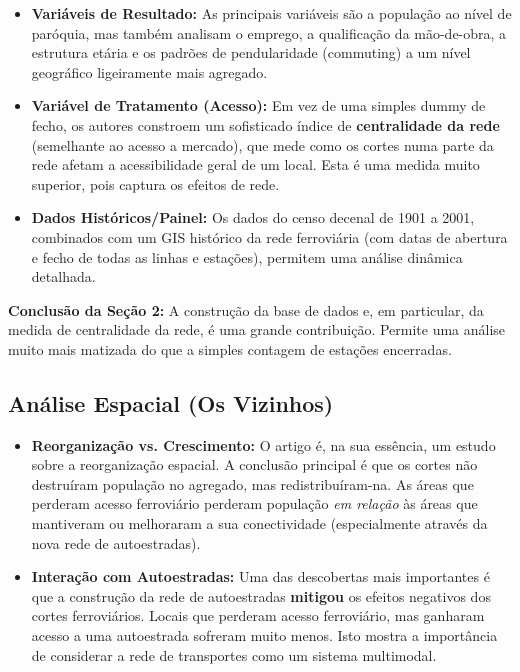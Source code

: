 \documentclass[12pt, a4paper]{article}
\begin{document}
\begin{itemize}
    \item \textbf{Variáveis de Resultado:} As principais variáveis são a população ao nível de paróquia, mas também analisam o emprego, a qualificação da mão-de-obra, a estrutura etária e os padrões de pendularidade (commuting) a um nível geográfico ligeiramente mais agregado.
    \item \textbf{Variável de Tratamento (Acesso):} Em vez de uma simples dummy de fecho, os autores constroem um sofisticado índice de \textbf{centralidade da rede} (semelhante ao acesso a mercado), que mede como os cortes numa parte da rede afetam a acessibilidade geral de um local. Esta é uma medida muito superior, pois captura os efeitos de rede.
    \item \textbf{Dados Históricos/Painel:} Os dados do censo decenal de 1901 a 2001, combinados com um GIS histórico da rede ferroviária (com datas de abertura e fecho de todas as linhas e estações), permitem uma análise dinâmica detalhada.
\end{itemize}

\noindent\textbf{Conclusão da Seção 2:} A construção da base de dados e, em particular, da medida de centralidade da rede, é uma grande contribuição. Permite uma análise muito mais matizada do que a simples contagem de estações encerradas.

\subsection{Análise Espacial (Os Vizinhos)}

\begin{itemize}
    \item \textbf{Reorganização vs. Crescimento:} O artigo é, na sua essência, um estudo sobre a reorganização espacial. A conclusão principal é que os cortes não destruíram população no agregado, mas redistribuíram-na. As áreas que perderam acesso ferroviário perderam população \textit{em relação} às áreas que mantiveram ou melhoraram a sua conectividade (especialmente através da nova rede de autoestradas).
    \item \textbf{Interação com Autoestradas:} Uma das descobertas mais importantes é que a construção da rede de autoestradas \textbf{mitigou} os efeitos negativos dos cortes ferroviários. Locais que perderam acesso ferroviário, mas ganharam acesso a uma autoestrada sofreram muito menos. Isto mostra a importância de considerar a rede de transportes como um sistema multimodal.
\end{itemize}
\end{document}
